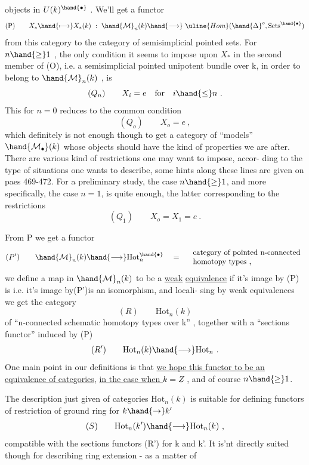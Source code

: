
objects in $U(k)^\hand{\bullet}$ . We'll get a functor
\[ \text{(P)}\qquad X_{*}\hand{\longmapsto}X_{*}(k) \ : \ \hand{\mathcal{M}}_{n}(k)\hand{\longrightarrow} \ \uline{Hom}(\hand{\Delta}^{o},\mathrm{Sets}^{\hand{\bullet}}) \]
from this category to the category of semisimplicial pointed sets. 
For $n\hand{\geq}1$ , the only condition it seems to impose upon $X_{*}$ in the
second member of (O), i.e.  a semisimplicial pointed unipotent bundle over
k, in order to belong to $\hand{\mathcal{M}}_{n}(k)$ , is
\[ (Q_{n})\qquad X_{i} = e \quad\text{for}\quad i \hand{\leq} n \ . \]
This for $n=0$ reduces to the common condition
\[ (Q_{o})\qquad X_{o} = e \ , \]
which definitely is not enough though to get a category of ``models''
$\hand{\mathcal{M}_{\bullet}}(k)$ whose objects should have the kind of properties we are after.
There are various kind of  restrictions one may want to impose, accor-%
ding to the type of situations one wants to describe, some hints along
these lines are given on paes 469-472. For a preliminary study, the
case $n\hand{\geq} 1$, and more specifically, the case $n=1$, is quite enough, the
latter corresponding to the restrictions
\[ (Q_{1})\qquad X_{o} = X_{1} = e \ . \]

From P we get a functor
\[ (P')\qquad \hand{\mathcal{M}}_{n}(k) \hand{\longrightarrow} \mathrm{Hot}^{\hand{\bullet}}_{n} \quad = \quad \begin{array}{l}\text{category of pointed n-connected}\\ \text{homotopy types ,}\end{array} \]
we define  a map in $\hand{\mathcal{M}}_{n}(k)$ to be a \uline{weak} \uline{equivalence} if it's
image by (P) is i.e. it's image by(P')is an isomorphism, and locali-%
sing by weak equivalences we get the category
\[ (R)\qquad \mathrm{Hot}_{n}(k) \]
of ``n-connected schematic homotopy types over k'' , together with a
``sections functor'' induced by (P)
\[ (R')\qquad \mathrm{Hot}_{n}(k) \hand{\longrightarrow} \mathrm{Hot}_{n} \ . \]
One main point in our definitions is that \uline{we hope this functor to be an}
\uline{equivalence of categories}, \uline{in the case when $k=\underline{Z}$} , and of course $n\hand{\geq} 1$.

The description just given of categories $\mathrm{Hot}_{n}(k)$ is suitable for
defining functors of restriction of ground ring for $k \hand{\rightarrow} k'$
\[ (S)\qquad \mathrm{Hot}_{n}(k')\hand{\longrightarrow} \mathrm{Hot}_{n}(k) \ , \]
compatible with the sections functors (R') for k and k'. It is'nt
directly suited though for describing ring extension - as a matter of

